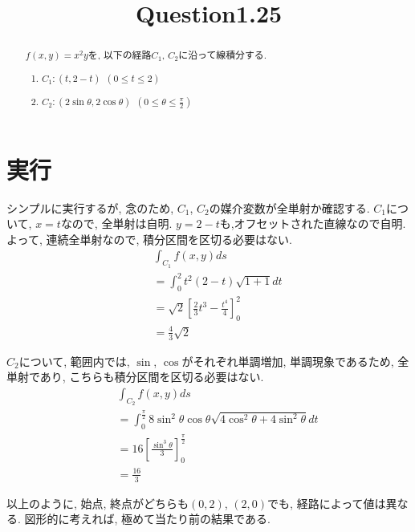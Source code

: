 \documentclass{jsarticle} \usepackage[dvipdfmx]{graphicx} \usepackage[dvipdfmx]{hyperref}
\title{Question1.25}
\begin{document}
\maketitle

\begin{abstract}
  $f(x, y) = x^2 y$を, 以下の経路$C_1$, $C_2$に沿って線積分する. 
  \begin{enumerate}
    \item $C_1:(t, 2-t)~~(0\leq t \leq 2)$
    \item $C_2:(2\sin\theta, 2\cos\theta)~~(0\leq \theta \leq \frac{\pi}{2})$
  \end{enumerate}

\end{abstract}

\section*{実行}
シンプルに実行するが, 念のため, $C_1$, $C_2$の媒介変数が全単射か確認する. 
$C_1$について, $x = t$なので, 全単射は自明. $y = 2 - t$も,オフセットされた直線なので自明.
よって, 連続全単射なので, 積分区間を区切る必要はない.
\begin{eqnarray}
  && \int_{C_1}f(x, y)ds \nonumber \\
  && = \int_0^2 t^2(2-t)\sqrt{1 + 1}dt \nonumber \\
  && = \sqrt{2} \left[\frac{2}{3}t^3 - \frac{t^4}{4} \right]^2_0 \nonumber \\
  && = \frac{4}{3}\sqrt{2}
\end{eqnarray}

$C_2$について, 範囲内では, $\sin$, $\cos$がそれぞれ単調増加, 単調現象であるため, 全単射であり, こちらも積分区間を区切る必要はない. 
\begin{eqnarray}
  && \int_{C_2}f(x, y)ds \nonumber \\
  && = \int_0^{\frac{\pi}{2}} 8 \sin^2 \theta \cos\theta \sqrt{4\cos^2 \theta + 4\sin^2 \theta}dt \nonumber \\
  && = 16 \left[\frac{\sin^3 \theta}{3} \right]^{\frac{\pi}{2}}_0 \nonumber \\
  && = \frac{16}{3}
\end{eqnarray}

以上のように, 始点, 終点がどちらも$(0, 2)$, $(2, 0)$でも, 経路によって値は異なる. 
図形的に考えれば, 極めて当たり前の結果である. 
\end{document}
